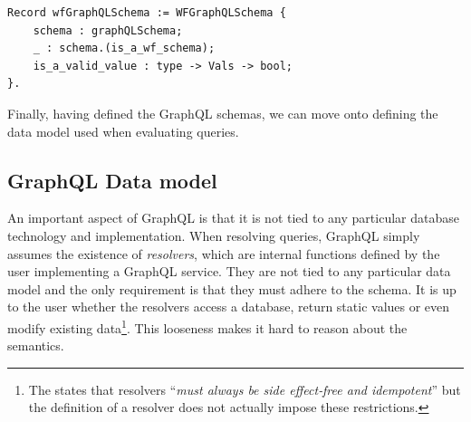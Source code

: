 \begin{verbatim}
Record wfGraphQLSchema := WFGraphQLSchema {
    schema : graphQLSchema;
    _ : schema.(is_a_wf_schema);
    is_a_valid_value : type -> Vals -> bool;
}.
\end{verbatim}



Finally, having defined the GraphQL schemas, we can move onto defining the data model used when evaluating queries.

\subsection{GraphQL Data model}\label{subsec:graph}

An important aspect of GraphQL is that it is not tied to any particular database technology and implementation. When resolving queries, GraphQL simply assumes the existence of \textit{resolvers}, which are internal functions defined by the user implementing a GraphQL service. They are not tied to any particular data model and the only requirement is that they must adhere to the schema. It is up to the user whether the resolvers access a database, return static values or even modify existing data\footnote{The \spec{} states that resolvers ``\textit{must always be side effect‐free and idempotent}'' but the definition of a resolver does not actually impose these restrictions.}. This looseness makes it hard to reason about the semantics.

